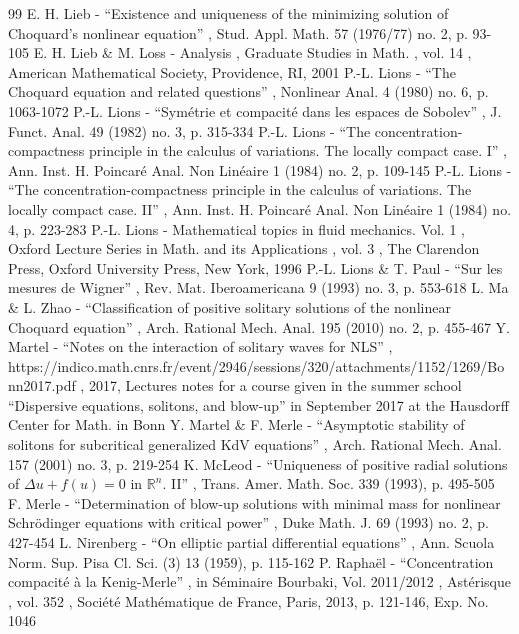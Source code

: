 \documentclass[11pt]{article}
\theoremstyle{definition}
\begin{document}
\begin{thebibliography}{99}
 E. H. Lieb - “Existence and uniqueness of the minimizing solution of Choquard’s nonlinear equation” , Stud. Appl. Math. 57 (1976/77) no. 2, p. 93-105
 E. H. Lieb \& M. Loss - Analysis , Graduate Studies in Math. , vol. 14 , American Mathematical Society, Providence, RI, 2001
 P.-L. Lions - “The Choquard equation and related questions” , Nonlinear Anal. 4 (1980) no. 6, p. 1063-1072
 P.-L. Lions - “Symétrie et compacité dans les espaces de Sobolev” , J. Funct. Anal. 49 (1982) no. 3, p. 315-334
 P.-L. Lions - “The concentration-compactness principle in the calculus of variations. The locally compact case. I” , Ann. Inst. H. Poincaré Anal. Non Linéaire 1 (1984) no. 2, p. 109-145
 P.-L. Lions - “The concentration-compactness principle in the calculus of variations. The locally compact case. II” , Ann. Inst. H. Poincaré Anal. Non Linéaire 1 (1984) no. 4, p. 223-283
 P.-L. Lions - Mathematical topics in fluid mechanics. Vol. 1 , Oxford Lecture Series in Math. and its Applications , vol. 3 , The Clarendon Press, Oxford University Press, New York, 1996
 P.-L. Lions \& T. Paul - “Sur les mesures de Wigner” , Rev. Mat. Iberoamericana 9 (1993) no. 3, p. 553-618
 L. Ma \& L. Zhao - “Classification of positive solitary solutions of the nonlinear Choquard equation” , Arch. Rational Mech. Anal. 195 (2010) no. 2, p. 455-467
 Y. Martel - “Notes on the interaction of solitary waves for NLS” , https://indico.math.cnrs.fr/event/2946/sessions/320/attachments/1152/1269/Bonn2017.pdf , 2017, Lectures notes for a course given in the summer school “Dispersive equations, solitons, and blow-up” in September 2017 at the Hausdorff Center for Math. in Bonn
 Y. Martel \& F. Merle - “Asymptotic stability of solitons for subcritical generalized KdV equations” , Arch. Rational Mech. Anal. 157 (2001) no. 3, p. 219-254
 K. McLeod - “Uniqueness of positive radial solutions of ${\Delta u+f(u)=0}$ in $\mathbb{R}^ n$. II” , Trans. Amer. Math. Soc. 339 (1993), p. 495-505
 F. Merle - “Determination of blow-up solutions with minimal mass for nonlinear Schrödinger equations with critical power” , Duke Math. J. 69 (1993) no. 2, p. 427-454
 L. Nirenberg - “On elliptic partial differential equations” , Ann. Scuola Norm. Sup. Pisa Cl. Sci. (3) 13 (1959), p. 115-162
 P. Raphaël - “Concentration compacité à la Kenig-Merle” , in Séminaire Bourbaki, Vol. 2011/2012 , Astérisque , vol. 352 , Société Mathématique de France, Paris, 2013, p. 121-146, Exp. No. 1046

\end{thebibliography}
\end{document}
